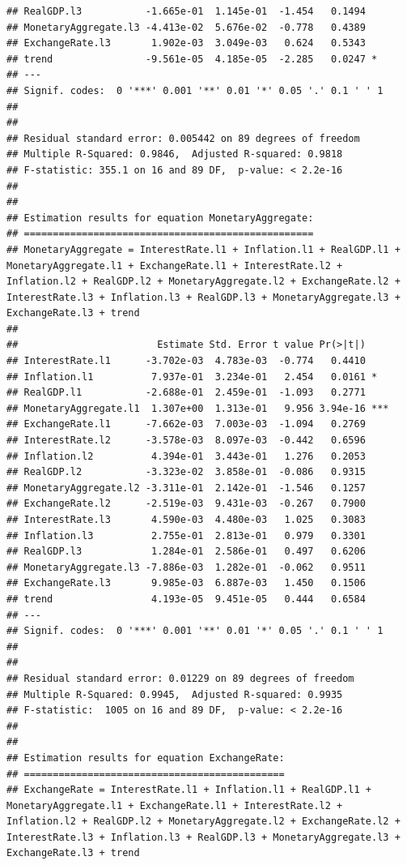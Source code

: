 \documentclass[11pt,preprint, authoryear]{elsarticle}
\numberwithin{equation}{section}
\numberwithin{figure}{section}
\numberwithin{table}{section}
\begin{document}
\begin{verbatim}
## RealGDP.l3           -1.665e-01  1.145e-01  -1.454   0.1494    
## MonetaryAggregate.l3 -4.413e-02  5.676e-02  -0.778   0.4389    
## ExchangeRate.l3       1.902e-03  3.049e-03   0.624   0.5343    
## trend                -9.561e-05  4.185e-05  -2.285   0.0247 *  
## ---
## Signif. codes:  0 '***' 0.001 '**' 0.01 '*' 0.05 '.' 0.1 ' ' 1
## 
## 
## Residual standard error: 0.005442 on 89 degrees of freedom
## Multiple R-Squared: 0.9846,  Adjusted R-squared: 0.9818 
## F-statistic: 355.1 on 16 and 89 DF,  p-value: < 2.2e-16 
## 
## 
## Estimation results for equation MonetaryAggregate: 
## ================================================== 
## MonetaryAggregate = InterestRate.l1 + Inflation.l1 + RealGDP.l1 + MonetaryAggregate.l1 + ExchangeRate.l1 + InterestRate.l2 + Inflation.l2 + RealGDP.l2 + MonetaryAggregate.l2 + ExchangeRate.l2 + InterestRate.l3 + Inflation.l3 + RealGDP.l3 + MonetaryAggregate.l3 + ExchangeRate.l3 + trend 
## 
##                        Estimate Std. Error t value Pr(>|t|)    
## InterestRate.l1      -3.702e-03  4.783e-03  -0.774   0.4410    
## Inflation.l1          7.937e-01  3.234e-01   2.454   0.0161 *  
## RealGDP.l1           -2.688e-01  2.459e-01  -1.093   0.2771    
## MonetaryAggregate.l1  1.307e+00  1.313e-01   9.956 3.94e-16 ***
## ExchangeRate.l1      -7.662e-03  7.003e-03  -1.094   0.2769    
## InterestRate.l2      -3.578e-03  8.097e-03  -0.442   0.6596    
## Inflation.l2          4.394e-01  3.443e-01   1.276   0.2053    
## RealGDP.l2           -3.323e-02  3.858e-01  -0.086   0.9315    
## MonetaryAggregate.l2 -3.311e-01  2.142e-01  -1.546   0.1257    
## ExchangeRate.l2      -2.519e-03  9.431e-03  -0.267   0.7900    
## InterestRate.l3       4.590e-03  4.480e-03   1.025   0.3083    
## Inflation.l3          2.755e-01  2.813e-01   0.979   0.3301    
## RealGDP.l3            1.284e-01  2.586e-01   0.497   0.6206    
## MonetaryAggregate.l3 -7.886e-03  1.282e-01  -0.062   0.9511    
## ExchangeRate.l3       9.985e-03  6.887e-03   1.450   0.1506    
## trend                 4.193e-05  9.451e-05   0.444   0.6584    
## ---
## Signif. codes:  0 '***' 0.001 '**' 0.01 '*' 0.05 '.' 0.1 ' ' 1
## 
## 
## Residual standard error: 0.01229 on 89 degrees of freedom
## Multiple R-Squared: 0.9945,  Adjusted R-squared: 0.9935 
## F-statistic:  1005 on 16 and 89 DF,  p-value: < 2.2e-16 
## 
## 
## Estimation results for equation ExchangeRate: 
## ============================================= 
## ExchangeRate = InterestRate.l1 + Inflation.l1 + RealGDP.l1 + MonetaryAggregate.l1 + ExchangeRate.l1 + InterestRate.l2 + Inflation.l2 + RealGDP.l2 + MonetaryAggregate.l2 + ExchangeRate.l2 + InterestRate.l3 + Inflation.l3 + RealGDP.l3 + MonetaryAggregate.l3 + ExchangeRate.l3 + trend 

\end{verbatim}
\end{document}

